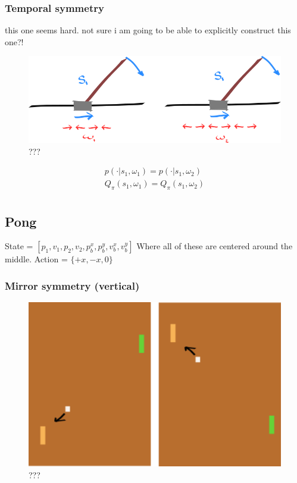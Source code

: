 \subsubsection{Temporal symmetry}

{\color{red} this one seems hard. not sure i am going to be able to explicitly construct this one?!}


\begin{figure}[!h]
\centering
\includegraphics[width=1\textwidth,height=0.25\textheight]{../../pictures/drawings/cart-pole-temporal-approx.png}
\caption{???}
\end{figure}

\begin{align*}
p(\cdot|s_1, \omega_1) = p(\cdot|s_1, \omega_2) \\
Q_{\pi}(s_1, \omega_1) = Q_{\pi}(s_1,\omega_2) \\
\end{align*}


\subsection{Pong}

State = $[p_1, v_1, p_2, v_2, p^x_b, p^y_b, v^x_b, v^y_b]$
Where all of these are centered around the middle.
Action = $\{+x, -x, 0\}$

\subsubsection{Mirror symmetry (vertical)}

\begin{figure}[!h]
\centering
\includegraphics[width=1\textwidth,height=0.25\textheight]{../../pictures/drawings/pong-vert-flip.png}
\caption{???}
\end{figure}


